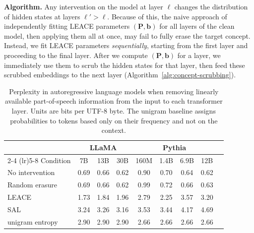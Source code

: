 \documentclass{article}
\theoremstyle{plain}
\theoremstyle{remark}
\theoremstyle{plain}
\theoremstyle{TheoremNum}
\begin{document}
\textbf{Algorithm.} Any intervention on the model at layer $\ell$ changes the distribution of hidden states at layers $\ell' > \ell$. Because of this, the naive approach of independently fitting LEACE parameters $(\mathbf{P}, \mathbf{b})$ for all layers of the clean model, then applying them all at once, may fail to fully erase the target concept. Instead, we fit LEACE parameters \emph{sequentially}, starting from the first layer and proceeding to the final layer. After we compute $(\mathbf{P}, \mathbf{b})$ for a layer, we immediately use them to scrub the hidden states for that layer, then feed these scrubbed embeddings to the next layer (Algorithm~\ref{alg:concept-scrubbing}).

\begin{table}[ht]
\centering
\begin{tabular}{lcccc cccc}
\toprule
& \multicolumn{3}{c}{LLaMA} & \multicolumn{4}{c}{Pythia}\\ \cmidrule(lr){2-4} \cmidrule(lr){5-8}
Condition       & 7B             & 13B        & 30B           & 160M          & 1.4B            & 6.9B          & 12B            \\
\midrule
No intervention & 0.69           & 0.66       & 0.62          & 0.90          & 0.70            & 0.64          & 0.62           \\
Random erasure  & 0.69           & 0.66       & 0.62          & 0.99          & 0.72            & 0.66          & 0.63           \\
\midrule
LEACE & 1.73           & 1.84       & 1.96          & 2.79          & 2.25            & 3.57          & 3.20              \\
SAL   & 3.24           & 3.26       & 3.16          & 3.53          & 3.44            & 4.17          & 4.69             \\
\midrule
unigram entropy & 2.90           & 2.90       & 2.90          & 2.66          & 2.66            & 2.66          & 2.66           \\
\bottomrule
\end{tabular}
\caption{Perplexity in autoregressive language models when removing linearly available part-of-speech information from the input to each transformer layer. Units are bits per UTF-8 byte. The unigram baseline assigns probabilities to tokens based only on their frequency and not on the context.}
\label{table:scrubbing-perplexity}
\end{table}
\end{document}
